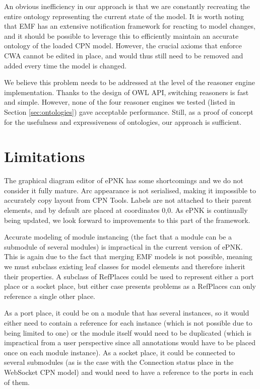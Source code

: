 An obvious inefficiency in our approach is that we are constantly recreating the
entire ontology representing the current state of the model. It is worth noting
that EMF has an extensive notification framework for reacting to model changes,
and it should be possible to leverage this to efficiently maintain an accurate
ontology of the loaded CPN model. However, the crucial axioms that enforce CWA
cannot be edited in place, and would thus still need to be removed and added
every time the model is changed.

We believe this problem needs to be addressed at the level of the reasoner
engine implementation. Thanks to the design of OWL API, switching reasoners is
fast and simple. However, none of the four reasoner engines we tested (listed in
Section \ref{sec:ontologies}) gave acceptable performance. Still, as a proof of
concept for the usefulness and expressiveness of ontologies, our approach is
sufficient.

\section{Limitations}\label{sec:limitations}

The graphical diagram editor of ePNK has some shortcomings and we do not
consider it fully mature. Arc appearance is not serialised, making it impossible
to accurately copy layout from CPN Tools. Labels are not attached to their
parent elements, and by default are placed at coordinates 0,0. As ePNK is
continually being updated, we look forward to improvements to this part of
the framework.

Accurate modeling of module instancing (the fact that a module can be a
submodule of several modules) is impractical in the current version of ePNK.
This is again due to the fact that merging EMF models is not possible, meaning
we must subclass existing leaf classes for model elements and therefore inherit
their properties. A subclass of RefPlaces could be used to represent either a
port place or a socket place, but either case presents problems as a RefPlaces
can only reference a single other place.

As a port place, it could be on a module that has several instances, so it would
either need to contain a reference for each instance (which is not possible due
to being limited to one) or the module itself would need to be duplicated
(which is impractical from a user perspective since all annotations would have to be
placed once on each module instance). As a socket place, it could be connected
to several submodules (as is the case with the Connection status place in the
WebSocket CPN model) and would need to have a reference to the ports in each of
them.
